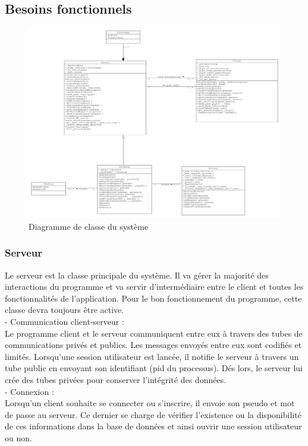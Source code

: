 \documentclass[a4paper,12pt]{article}
\begin{document}
\subsection{Besoins fonctionnels}

\begin{figure}[h!]
\centering
\includegraphics[width=16cm]{images/newSystemClassDiagram.jpg}
\caption{Diagramme de classe du système}
\label{fig:UerUseCase}
\end{figure}

\subsubsection{Serveur}
Le serveur est la classe principale du système. Il va gérer la majorité des interactions du programme et va servir d'intermédiaire entre le client et toutes les fonctionnalités de l'application. Pour le bon fonctionnement du programme, cette classe devra toujours être active.\\

- Communication client-serveur : \\
Le programme client et le serveur communiquent entre eux à travers des tubes de communications privés et publics. Les messages envoyés entre eux sont codifiés et limités.
Lorsqu'une session utilisateur est lancée, il notifie le serveur à travers un tube public en envoyant son identifiant (pid du processus). 
Dés lors, le serveur lui crée des tubes privées pour conserver l'intégrité des données.\\

- Connexion : \\
Lorsqu'un client souhaite se connecter ou s'inscrire, il envoie son pseudo et mot de passe au serveur. Ce dernier se charge de vérifier l'existence ou la disponibilité de ces informations dans la base de données et ainsi ouvrir une session utilisateur ou non. 
\end{document}
